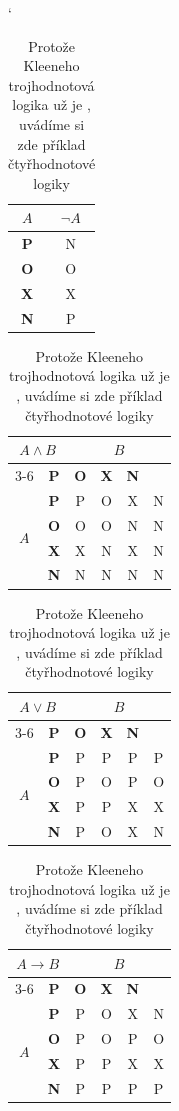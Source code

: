 \documentclass[a4paper, 11pt]{article}
\begin{document}
\begin{table}[ht]
\catcode`
\begin{tabular}{|c|c|} \hline
$A$         &   $\neg A$ \\ \hline
\textbf{P}  &   N \\ \hline
\textbf{O}  &   O \\ \hline
\textbf{X}  &   X \\ \hline
\textbf{N}  &   P \\ \hline
\end{tabular}
\begin{tabular}{|c|c|c|c|c|c|}
\hline
\multicolumn{2}{|c|}{\multirow{2}{*}{{$A \wedge B$}}} & \multicolumn{4}{c|}{$B$} \\
\cline{3-6}
\multicolumn{2}{|c|}{} & \textbf{P} & \textbf{O} &\textbf{X}& \textbf{N} \\
\hline
\multirow{4}{*}{$A$} & \textbf{P} & P & O & X & N \\
\cline{2-6}
& \textbf{O} & O & O & N & N \\
\cline{2-6}
& \textbf{X} & X & N & X & N \\
\cline{2-6}
& \textbf{N} & N & N & N & N \\
\hline
\end{tabular}
\begin{tabular}{|c|c|c|c|c|c|}
\hline
\multicolumn{2}{|c|}{\multirow{2}{*}{{$A \vee B$}}} & \multicolumn{4}{c|}{$B$} \\
\cline{3-6}
\multicolumn{2}{|c|}{} & \textbf{P} & \textbf{O} &\textbf{X}& \textbf{N} \\
\hline
\multirow{4}{*}{$A$} & \textbf{P} & P & P & P & P \\
\cline{2-6}
& \textbf{O} & P & O & P & O \\
\cline{2-6}
& \textbf{X} & P & P & X & X \\
\cline{2-6}
& \textbf{N} & P & O & X & N \\
\hline
\end{tabular}
\begin{tabular}{|c|c|c|c|c|c|}
\hline
\multicolumn{2}{|c|}{\multirow{2}{*}{{$A \rightarrow B$}}} & \multicolumn{4}{c|}{$B$} \\
\cline{3-6}
\multicolumn{2}{|c|}{} & \textbf{P} & \textbf{O} &\textbf{X}& \textbf{N} \\
\hline
\multirow{4}{*}{$A$} & \textbf{P} & P & O & X & N \\
\cline{2-6}
& \textbf{O} & P & O & P & O \\
\cline{2-6}
& \textbf{X} & P & P & X & X \\
\cline{2-6}
& \textbf{N} & P & P & P & P \\
\hline
\end{tabular}
\caption{Protože Kleeneho trojhodnotová logika už je , uvádíme si zde příklad čtyřhodnotové logiky}
\label{tab:logiky}
\end{table}
\end{document}
